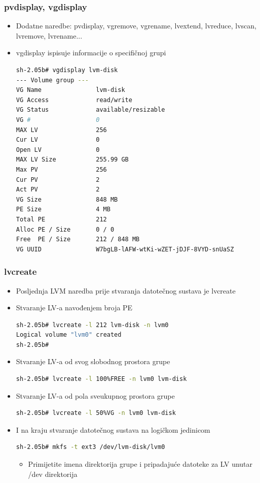 \documentclass[croatian,t]{beamer} %
\begin{document}
	\begin{frame}[fragile]
	\frametitle{pvdisplay, vgdisplay}
		\begin{itemize}
		\item Dodatne naredbe: pvdisplay, vgremove, vgrename, lvextend, lvreduce, lvscan, lvremove, lvrename...
		\item vgdisplay ispisuje informacije o specifičnoj grupi
			\begin{lstlisting}[basicstyle={\tiny\ttfamily},language=bash]
sh-2.05b# vgdisplay lvm-disk
--- Volume group ---
VG Name               lvm-disk
VG Access             read/write
VG Status             available/resizable
VG #                  0
MAX LV                256
Cur LV                0
Open LV               0
MAX LV Size           255.99 GB
Max PV                256
Cur PV                2
Act PV                2
VG Size               848 MB
PE Size               4 MB
Total PE              212
Alloc PE / Size       0 / 0
Free  PE / Size       212 / 848 MB
VG UUID               W7bgLB-lAFW-wtKi-wZET-jDJF-8VYD-snUaSZ
			\end{lstlisting}
		\end{itemize}
	\end{frame}

	\begin{frame}[fragile]
	\frametitle{lvcreate}
		\begin{itemize}
			\item Posljednja LVM naredba prije stvaranja datotečnog sustava je lvcreate
			\item Stvaranje LV-a navođenjem broja PE
			\begin{lstlisting}[basicstyle={\tiny\ttfamily},language=bash]
sh-2.05b# lvcreate -l 212 lvm-disk -n lvm0
Logical volume "lvm0" created
sh-2.05b#
			\end{lstlisting}
			\item Stvaranje LV-a od svog slobodnog prostora grupe
			\begin{lstlisting}[basicstyle={\tiny\ttfamily},language=bash]
sh-2.05b# lvcreate -l 100%FREE -n lvm0 lvm-disk
			\end{lstlisting}
			\item Stvaranje LV-a od pola sveukupnog prostora grupe
			\begin{lstlisting}[basicstyle={\tiny\ttfamily},language=bash]
sh-2.05b# lvcreate -l 50%VG -n lvm0 lvm-disk
			\end{lstlisting}
			\item I na kraju stvaranje datotečnog sustava na logičkom jedinicom
			\begin{lstlisting}[basicstyle={\tiny\ttfamily},language=bash]
sh-2.05b# mkfs -t ext3 /dev/lvm-disk/lvm0
			\end{lstlisting}
			\begin{itemize}
				\item Primijetite imena direktorija grupe i pripadajuće datoteke za LV unutar /dev direktorija
			\end{itemize}
		\end{itemize}	
	\end{frame}
	
\end{document}
